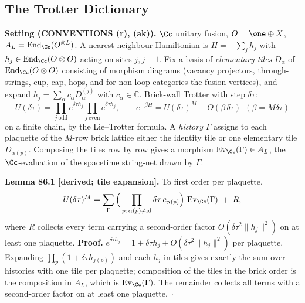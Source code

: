 \subsection{The Trotter Dictionary}

\textbf{Setting (CONVENTIONS (r), (ak)).}  \(\Cc\) unitary fusion, \(O=\one\oplus X\), \(A_L=\operatorname{End}_{\Cc}(O^{\otimes L})\).
A nearest-neighbour Hamiltonian is \(H=-\sum_{j}h_j\) with
\(h_j\in\operatorname{End}_{\Cc}(O\otimes O)\) acting on sites \(j,j+1\).
Fix a basis of \emph{elementary tiles} \(D_\alpha\) of
\(\operatorname{End}_{\Cc}(O\otimes O)\) consisting of morphism diagrams
(vacancy projectors, through-strings, cup, cap, hops, and for non-loop
categories the fusion vertices), and expand \(h_j=\sum_\alpha c_\alpha D_\alpha^{(j)}\)
with \(c_\alpha\in\mathbb{C}\).  Brick-wall Trotter with step \(\delta\tau\):
\[
  U(\delta\tau)=\prod_{j\ \mathrm{odd}}e^{\delta\tau h_j}\prod_{j\ \mathrm{even}}e^{\delta\tau h_j},
  \qquad
  e^{-\beta H}=U(\delta\tau)^{M}+O(\beta\,\delta\tau)\ \ (\beta=M\delta\tau)
\]
on a finite chain, by the Lie--Trotter formula.  A \emph{history} \(\Gamma\)
assigns to each plaquette of the \(M\)-row brick lattice either the identity
tile or one elementary tile \(D_{\alpha(p)}\).  Composing the tiles row by
row gives a morphism \(\operatorname{Ev}_{\Cc}(\Gamma)\in A_L\), the
\(\Cc\)-evaluation of the spacetime string-net drawn by \(\Gamma\).

\textbf{Lemma 86.1 [derived; tile expansion].}  To first order per plaquette,
\[
  U(\delta\tau)^{M}
  =\sum_{\Gamma}\Big(\prod_{p:\,\alpha(p)\neq\mathrm{id}}\delta\tau\,c_{\alpha(p)}\Big)\,
  \operatorname{Ev}_{\Cc}(\Gamma)\;+\;R,
\]
where \(R\) collects every term carrying a second-order factor
\(O(\delta\tau^2\|h_j\|^2)\) on at least one plaquette.
\textbf{Proof.}  \(e^{\delta\tau h_j}=1+\delta\tau h_j+O(\delta\tau^2\|h_j\|^2)\) per plaquette.
Expanding \(\prod_p(1+\delta\tau h_{j(p)})\) and each \(h_j\) in tiles gives
exactly the sum over histories with one tile per plaquette; composition of
the tiles in the brick order is the composition in \(A_L\), which is
\(\operatorname{Ev}_{\Cc}(\Gamma)\).  The remainder collects all terms with a
second-order factor on at least one plaquette.  \(\square\)


